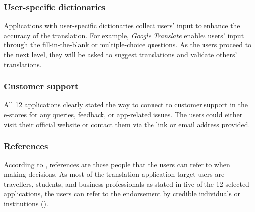 \documentclass[english]{textolivre}
\begin{document}
\subsubsection{User-specific dictionaries}\label{sec-contributors-expl}
Applications with user-specific dictionaries collect users’ input to enhance the accuracy of the translation. For example, \textit{Google Translate} enables users’ input through the fill-in-the-blank or multiple-choice questions. As the users proceed to the next level, they will be asked to suggest translations and validate others’ translations.

\subsubsection{Customer support}\label{sec-contributors-expl}
All 12 applications clearly stated the way to connect to customer support in the e-stores for any queries, feedback, or app-related issues. The users could either visit their official website or contact them via the link or email address provided.

\subsubsection{References}\label{sec-contributors-expl}
According to \textcite{ryan_machine_1993}, references are those people that the users can refer to when making decisions. As most of the translation application target users are travellers, students, and business professionals as stated in five of the 12 selected applications, the users can refer to the endorsement by credible individuals or institutions ().
\end{document}
